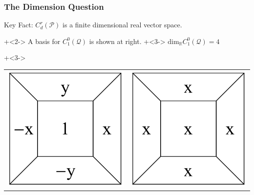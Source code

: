 \documentclass{beamer}
\theoremstyle{definition}
\theoremstyle{remark}
\newcommand{\QC}{\mathcal{Q}}
\newcommand{\PC}{\mathcal{P}}
\newcommand{\R}{\mathbb{R}}
\begin{document}
\begin{frame}
\frametitle{The Dimension Question}

Key Fact: $C^r_d(\PC)$ is a finite dimensional real vector space.

\begin{minipage}{.3\textwidth}
\onslide+<2->{
A basis for $C^0_1(\QC)$
is shown at right.}
\vspace{10 pt}
\onslide+<3->{
$\mbox{dim}_\R C^0_1(\QC)=4$}
\end{minipage}
\begin{minipage}{.5\textwidth}
\onslide+<3->{
\begin{tabular}{cc}
\includegraphics[scale=.23]{ToySpline.pdf} & \includegraphics[scale=.23]{ToySplinex.pdf} \\

\end{tabular}}
\end{minipage}
\end{frame}
\end{document}
